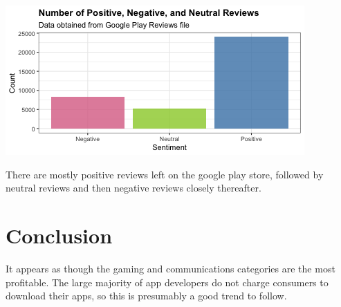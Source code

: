 \documentclass[11pt,preprint, authoryear]{elsarticle}
\let\origfigure\figure
\let\endorigfigure\endfigure
\renewenvironment{figure}[1][2] {
    \expandafter\origfigure\expandafter[H]
} {
    \endorigfigure
}
\numberwithin{equation}{section}
\numberwithin{figure}{section}
\numberwithin{table}{section}
\begin{document}
\begin{figure}[H]

{\centering \includegraphics{q5_files/figure-latex/Figure5-1} 

}

\caption{Ratings of Applications based on Categories \label{Figure5}}\label{fig:Figure5}
\end{figure}

There are mostly positive reviews left on the google play store,
followed by neutral reviews and then negative reviews closely
thereafter.

\hypertarget{conclusion}{%
\section{\texorpdfstring{Conclusion
\label{Conclusion}}{Conclusion }}\label{conclusion}}

It appears as though the gaming and communications categories are the
most profitable. The large majority of app developers do not charge
consumers to download their apps, so this is presumably a good trend to
follow.


\end{document}
